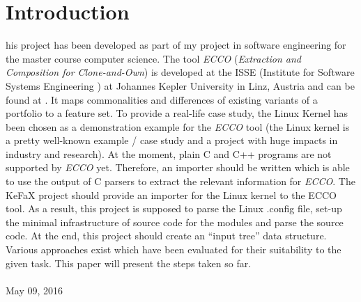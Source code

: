 \section{Introduction}
his project has been developed as part of my project in software engineering for the master course computer science.
The tool {\it ECCO}
({\it Extraction and Composition for Clone-and-Own})\cite{fischer2014enhancing}
is developed at the ISSE (Institute for Software Systems Engineering \cite{ISSE_URL})
at Johannes Kepler University in Linz, Austria 
and can be found at \cite{ecourl}.
It maps commonalities and differences of existing variants 
of a portfolio to a feature set.
To provide a real-life case study, the Linux Kernel has been chosen as a 
demonstration example for the {\it ECCO} tool 
(the Linux kernel is a pretty well-known example / case study 
and a project with huge impacts in industry and research).
At the moment, plain C and C++ programs are not supported by {\it ECCO} yet.
Therefore, an importer should be written which is
able to use the output of C parsers to extract the relevant information
for {\it ECCO}. 
The  KeFaX project should provide an importer for the Linux kernel to the ECCO tool. 
As a result,
this project is supposed to parse the Linux .config file, 
set-up the minimal infrastructure of source code for the modules and 
parse the source code. At the end, this project should create an “input tree” data
structure. 
Various approaches exist which have been evaluated
for their suitability to the given task. 
This paper will present the steps taken so far.
\\ \ \\
\hfill May 09, 2016
